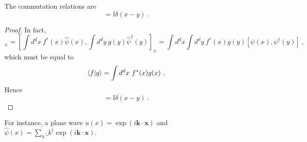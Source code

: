     The commutation relations are 
    \begin{equation*}
        [\psi(x), \psi^\dagger (y)] = \mathbb I \delta (x - y) ~.
    \end{equation*}
    \begin{proof}
        In fact,
        \begin{equation*}
            [\hat \psi (f), \hat \psi^\dagger (g)]_\pm = [\int d^d x ~ f^* (x) \hat \psi(x), \int d^d y ~ g(y) \hat \psi^\dagger (y)]_\pm = \int d^d x \int d^d y ~ f^*(x) g(y) [\psi(x), \psi^\dagger (y)]  ~,
        \end{equation*}
        which must be equal to 
        \begin{equation*}
            \langle f\vert g\rangle = \int d^d x ~ f^* (x) g(x) ~.
        \end{equation*}
        Hence 
        \begin{equation*}
            [\psi(x), \psi^\dagger (y)] = \mathbb I \delta (x - y) ~.
        \end{equation*}
    \end{proof}

    For instance, a plane wave $u(x) = \exp (i \mathbf k \cdot \mathbf x) $ and $\hat \psi(x) = \sum_k \hat_k^\dagger \exp(i \mathbf k \cdot \mathbf x)$.